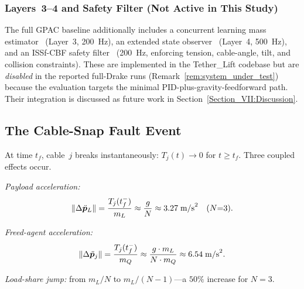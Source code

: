 \subsubsection{Layers~3--4 and Safety Filter (Not Active in This Study)}

The full GPAC baseline additionally includes a concurrent learning mass estimator~\cite{chowdhary2010concurrent} (Layer~3, 200~Hz), an extended state observer~\cite{han2009pid} (Layer~4, 500~Hz), and an ISSf-CBF safety filter~\cite{ames2017control,kolathaya2019input} (200~Hz, enforcing tension, cable-angle, tilt, and collision constraints). These are implemented in the Tether\_Lift codebase but are \emph{disabled} in the reported full-Drake runs (Remark~\ref{rem:system_under_test}) because the evaluation targets the minimal PID-plus-gravity-feedforward path. Their integration is discussed as future work in Section~\ref{Section_VII:Discussion}.

\subsection{The Cable-Snap Fault Event}
\label{sec:cable_snap}

At time $t_f$, cable~$j$ breaks instantaneously: $T_j(t) \to 0$ for $t \geq t_f$. Three coupled effects occur.

\emph{Payload acceleration:}
\begin{equation}\label{eq:payload_accel}
  \lVert \Delta \ddot{\bm{p}}_L \rVert = \frac{T_j(t_f^-)}{m_L} \approx \frac{g}{N} \approx 3.27 \;\text{m/s}^2 \quad (N{=}3).
\end{equation}

\emph{Freed-agent acceleration:}
\begin{equation}\label{eq:freed_accel}
  \lVert \Delta \ddot{\bm{p}}_j \rVert = \frac{T_j(t_f^-)}{m_Q} \approx \frac{g \cdot m_L}{N \cdot m_Q} \approx 6.54 \;\text{m/s}^2.
\end{equation}

\emph{Load-share jump:} from $m_L/N$ to $m_L/(N{-}1)$---a $50\%$ increase for $N{=}3$.

